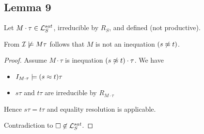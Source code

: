 \documentclass[%
handout,
]{beamer}
\begin{document}
\subsection{Lemma 9}
\begin{frame}
    \begin{lemma}\label{inequation}
        Let $M\cdot\tau\in\mathcal{L}_S^{sat}$,
        irreducible by $R_S$, and defined (not productive).

        From $\mathcal{I}\not\models M\tau$ follows that $M$ is not an inequation $(s\not\approx t)$.
        \begin{proof}
        Assume $M\cdot\tau$ is inequation $(s\not\approx t)\cdot\tau$. We have
        \begin{itemize}
            \item $I_{M\cdot\tau}\models (s\approx t)\tau$
            \item $s\tau$ and $t\tau$ are irreducible by $R_{M\cdot\tau}$
        \end{itemize}
        Hence $s\tau = t\tau$ and equality resolution is applicable.

        Contradiction to $\square\not\in\mathcal{L}_S^{sat}$.
    \end{proof}
    \end{lemma}

\end{frame}
\end{document}
